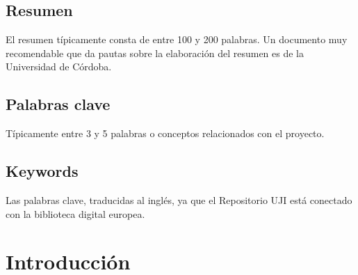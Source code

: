 \documentclass[pdftex,11pt,a4paper]{book}
\begin{document}

\thispagestyle{empty} %

\clearpage %

\section*{Resumen}

El resumen típicamente consta de entre 100 y 200 palabras. Un documento muy recomendable que da pautas sobre la elaboración del resumen es de la Universidad de Córdoba.

\section*{Palabras clave}

Típicamente entre 3 y 5 palabras o conceptos relacionados con el proyecto.

\section*{Keywords}

Las palabras clave, traducidas al inglés, ya que el Repositorio UJI está conectado con la biblioteca digital europea. 

\thispagestyle{empty} %

\cleardoublepage




\pagestyle{plain} %

\tableofcontents

\cleardoublepage










\chapter{Introducción}
\end{document}

